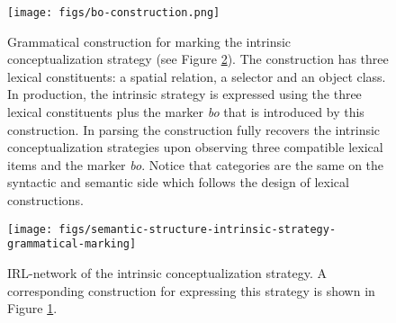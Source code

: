 \begin{figure}
\begin{center}
\texttt{[image: figs/bo-construction.png]}
\end{center}
\caption[Example grammatical marker construction]{%
Grammatical construction for marking the intrinsic conceptualization strategy
(see Figure \ref{f:semantic-structure-grammar-intrinsic}). The construction
has three lexical constituents: a spatial relation, a selector and an object class. In production,
the intrinsic strategy is expressed using the three lexical constituents plus the marker \textit{bo}
that is introduced by this construction. In parsing the construction fully recovers
the intrinsic conceptualization strategies upon observing three compatible lexical items 
and the marker \textit{bo}.
Notice that categories are the same on the syntactic and semantic side 
which follows the design of lexical constructions.}
\label{f:bo-construction}
\end{figure}

\begin{figure}
\begin{center}
\texttt{[image: figs/semantic-structure-intrinsic-strategy-grammatical-marking]}
\end{center}
\caption[Semantic structure intrinsic conceptualization strategy]{IRL-network of the intrinsic conceptualization strategy. A corresponding construction
for expressing this strategy is shown in Figure \ref{f:bo-construction}.}
\label{f:semantic-structure-grammar-intrinsic}
\end{figure}


